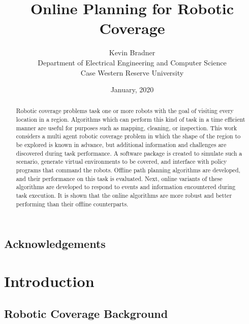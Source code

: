 \documentclass[letterpaper, 12pt, leqno]{report}
\begin{document}

\title{Online Planning for Robotic Coverage}
\author{Kevin Bradner\\Department of Electrical Engineering and Computer Science\\Case Western Reserve University}
\date{January, 2020}
\maketitle

\tableofcontents

\listoftables

\listoffigures

\section*{Acknowledgements}

\begin{abstract}
Robotic coverage problems task one or more robots with the goal of visiting every location in a region. Algorithms which can perform this kind of task in a time efficient manner are useful for purposes such as mapping, cleaning, or inspection. This work considers a multi agent robotic coverage problem in which the shape of the region to be explored is known in advance, but additional information and challenges are discovered during task performance. A software package is created to simulate such a scenario, generate virtual environments to be covered, and interface with policy programs that command the robots. Offline path planning algorithms are developed, and their performance on this task is evaluated. Next, online variants of these algorithms are developed to respond to events and information encountered during task execution. It is shown that the online algorithms are more robust and better performing than their offline counterparts.
\end{abstract}


\chapter{Introduction}

\section{Robotic Coverage Background}
\end{document}
